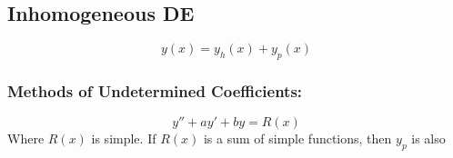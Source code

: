 \documentclass[a4paper,norsk, 10pt]{article}
\begin{document}
\subsection{Inhomogeneous DE}
\begin{equation}
y(x) = y_h(x) + y_p(x)
\end{equation}
\subsubsection{Methods of Undetermined Coefficients:}
\begin{equation}
y'' + ay' + by = R(x)
\end{equation}
Where $R(x)$ is simple. If $R(x)$ is a sum of simple functions, then $y_p$ is also 
\end{document}
